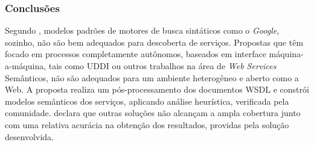 \subsubsection{Conclusões}

Segundo \cite{lausen2007finding}, modelos padrões de motores de busca sintáticos como o \textit{Google}, sozinho, não são bem adequados para descoberta de serviços. Propostas que têm focado em processos completamente autônomos, baseados em interface máquina-a-máquina, tais como UDDI ou outros trabalhos na área de \textit{Web Services} Semânticos, não são adequados para um ambiente heterogêneo e aberto como a Web. A proposta realiza um pós-processamento dos documentos WSDL e constrói modelos semânticos dos serviços, aplicando análise heurística, verificada pela comunidade. \cite{lausen2007finding} declara que outras soluções não alcançam a ampla cobertura junto com uma relativa acurácia na obtenção dos resultados, providas pela solução desenvolvida.
